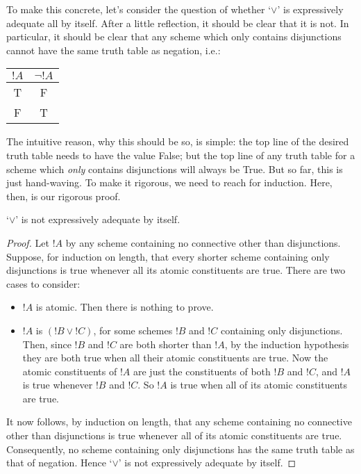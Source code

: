 \documentclass[../../../include/open-logic-section]{subfiles}
\begin{document}
 To make this concrete, let's consider the question of whether `$\lor$' is expressively adequate all by itself. After a little reflection, it should be clear that it is not. In particular, it should be clear that any scheme which only contains disjunctions cannot have the same truth table as negation, i.e.:
				\begin{center}
				\begin{tabular}{c | c}
				${!A}$ & $\lnot {!A}$\\
				\hline
				 T &  F \\
				 F & T
				\end{tabular}
				\end{center}
The intuitive reason, why this should be so, is simple: the top line of the desired truth table needs to have the value False; but the top line of any truth table for a scheme which \emph{only} contains disjunctions will always be True. But so far, this is just hand-waving. To make it rigorous, we need to reach for induction. Here, then, is our rigorous proof.
 	\begin{prop}
		`$\lor$' is not expressively adequate by itself.
		\begin{proof}
			Let ${!A}$ by any scheme containing no connective other than disjunctions. Suppose, for induction on length, that every shorter scheme containing only disjunctions is true whenever all its atomic constituents are true. There are two cases to consider:
				\begin{itemize}
					\item ${!A}$ is atomic. Then there is nothing to prove.
					\item ${!A}$ is $({!B} \lor {!C})$, for some schemes ${!B}$ and ${!C}$ containing only disjunctions. Then, since ${!B}$ and ${!C}$ are both shorter than ${!A}$, by the induction hypothesis they are both true when all their atomic constituents are true. Now the atomic constituents of ${!A}$ are just the constituents of both ${!B}$ and ${!C}$, and ${!A}$ is true whenever ${!B}$ and ${!C}$. So ${!A}$ is true when all of its atomic constituents are true.
				\end{itemize}
			It now follows, by induction on length, that any scheme containing no connective other than disjunctions is true whenever all of its atomic constituents are true. Consequently, no scheme containing only disjunctions has the same truth table as that of negation. Hence `$\lor$' is not expressively adequate by itself.
		\end{proof}
	\end{prop}\noindent
\end{document}
